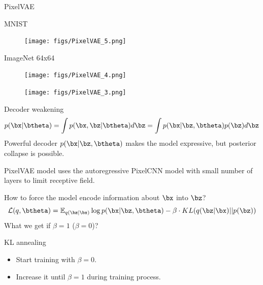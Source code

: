\begin{frame}{PixelVAE}
	\begin{minipage}[t]{0.5\columnwidth}
		MNIST
		\begin{figure}
			\centering
			\texttt{[image: figs/PixelVAE\_5.png]}
		\end{figure}
	\end{minipage}%
	\begin{minipage}[t]{0.5\columnwidth}
		ImageNet 64x64
		\begin{figure}
			\centering
			\texttt{[image: figs/PixelVAE\_4.png]}
		\end{figure}
	\end{minipage}
	\begin{figure}
	    \centering
	    \texttt{[image: figs/PixelVAE\_3.png]}
	\end{figure}
	
\end{frame}
\begin{frame}{Decoder weakening}
	\[
		p(\bx | \btheta) = \int p(\bx, \bz | \btheta) d \bz = \int p(\bx | \bz, \btheta) p(\bz) d \bz 
	\]
	Powerful decoder $p(\bx | \bz, \btheta)$ makes the model expressive, but posterior collapse is possible.
	
	PixelVAE model uses the autoregressive PixelCNN model with small number of layers to limit receptive field.
	
	How to force the model encode information about $\bx$ into $\bz$?
	\[
	    \mathcal{L}(q, \btheta) = \mathbb{E}_{q(\bz | \bx)} \log p(\bx | \bz, \btheta) - \beta \cdot KL (q(\bz | \bx) || p(\bz))
	\]
	What we get if $\beta = 1$ ($\beta = 0$)? \\
	
	\begin{block}{KL annealing}
		\begin{itemize}
		    \item Start training with $\beta = 0$.
		    \item Increase it until $\beta = 1$ during training process.
		\end{itemize}
	\end{block}
\end{frame}
